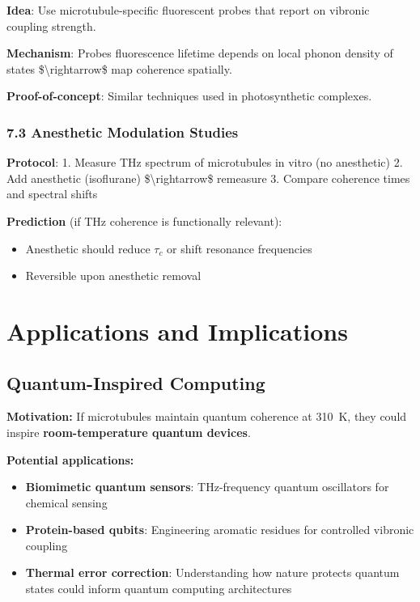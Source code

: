 \textbf{Idea}: Use microtubule-specific fluorescent probes that report
on vibronic coupling strength.

\textbf{Mechanism}: Probe\textquotesingle s fluorescence lifetime
depends on local phonon density of states \$\textbackslash rightarrow\$
map coherence spatially.

\textbf{Proof-of-concept}: Similar techniques used in photosynthetic
complexes.

\subsubsection{7.3 Anesthetic Modulation
Studies}\label{anesthetic-modulation-studies}

\textbf{Protocol}: 1. Measure THz spectrum of microtubules in vitro (no
anesthetic) 2. Add anesthetic (isoflurane) \$\textbackslash rightarrow\$
remeasure 3. Compare coherence times and spectral shifts

\textbf{Prediction} (if THz coherence is functionally relevant):
\begin{itemize}
\item Anesthetic should reduce $\tau_c$ or shift resonance frequencies
\item Reversible upon anesthetic removal
\end{itemize}

\section{Applications and Implications}

\subsection{Quantum-Inspired Computing}

\textbf{Motivation:} If microtubules maintain quantum coherence at 310~K, they could inspire \textbf{room-temperature quantum devices}.

\textbf{Potential applications:}
\begin{itemize}
\item \textbf{Biomimetic quantum sensors}: THz-frequency quantum oscillators for chemical sensing
\item \textbf{Protein-based qubits}: Engineering aromatic residues for controlled vibronic coupling
\item \textbf{Thermal error correction}: Understanding how nature protects quantum states could inform quantum computing architectures
\end{itemize}

